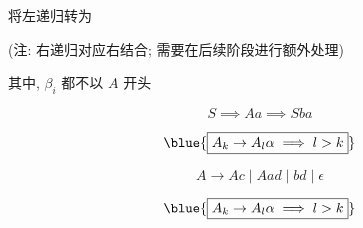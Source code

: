 \begin{frame}{}
  \begin{center}
    

    \pause
    
    将左递归转为

    \pause
    \vspace{0.50cm}
    (注: 右递归对应右结合; 需要在后续阶段进行额外处理)
  \end{center}
\end{frame}

\begin{frame}{}
  \begin{center}
    
    其中, $\beta_{i}$ 都不以 $A$ 开头

    \vspace{0.30cm}
    
  \end{center}
\end{frame}

\begin{frame}{}
  

  \pause
  
\end{frame}

\begin{frame}{}
  \begin{center}

    \vspace{-0.30cm}
    

    \vspace{-0.30cm}
    \[
      S \implies Aa \implies Sba
    \]

    \pause

    \vspace{-1.00cm}
    \[
      \blue{\boxed{A_{k} \to A_{l} \alpha \implies l > k}}
    \]
  \end{center}
\end{frame}

\begin{frame}{}
  

  \[
    A \to Ac \mid Aad \mid bd \mid \epsilon
  \]

  

  \vspace{0.30cm}
  \[
      \blue{\boxed{A_{k} \to A_{l} \alpha \implies l > k}}
  \]
\end{frame}

